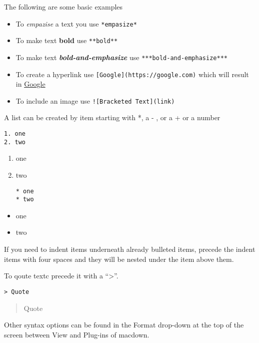 The following are some basic examples

\begin{itemize}

\item
  To \emph{empazise} a text you use \texttt{*empasize*}
\item
  To make text \textbf{bold} use \texttt{**bold**}
\item
  To make text \textbf{\emph{bold-and-emphasize}} use
  \texttt{***bold-and-emphasize***}
\item
  To create a hyperlink use \texttt{{[}Google{]}(https://google.com)}
  which will result in \href{https://google.com}{Google}
\item
  To include an image use \texttt{!{[}Bracketed\ Text{]}(link)}
\end{itemize}

A list can be created by item starting with *, a - , or a + or a
number

\begin{verbatim}
1. one
2. two
\end{verbatim}

\begin{enumerate}
\def\labelenumi{\arabic{enumi}.}
\item
  one
\item
  two

\begin{verbatim}
* one
* two
\end{verbatim}
\end{enumerate}

\begin{itemize}

\item
  one
\item
  two
\end{itemize}

If you need to indent items underneath already bulleted items, precede
the indent items with four spaces and they will be nested under the item
above them.

To qoute textc precede it with a ``\textgreater{}''.

\begin{verbatim}
> Quote
\end{verbatim}

\begin{quote}
Quote
\end{quote}

Other syntax options can be found in the Format drop-down at the top of
the screen between View and Plug-ins of macdown.

